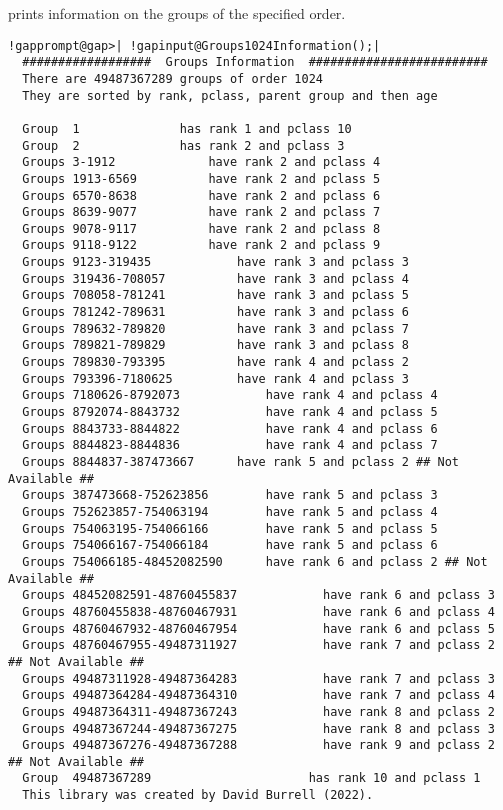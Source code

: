 \documentclass[a4paper,11pt]{report}
\begin{document}
{{{ prints information on the groups of the specified order. 
\begin{Verbatim}[commandchars=!@|,fontsize=\small,frame=single,label=Example]
  !gapprompt@gap>| !gapinput@Groups1024Information();|
  ##################  Groups Information  #########################
  There are 49487367289 groups of order 1024
  They are sorted by rank, pclass, parent group and then age
  
  Group  1				has rank 1 and pclass 10
  Group  2				has rank 2 and pclass 3
  Groups 3-1912				have rank 2 and pclass 4
  Groups 1913-6569			have rank 2 and pclass 5
  Groups 6570-8638			have rank 2 and pclass 6
  Groups 8639-9077			have rank 2 and pclass 7
  Groups 9078-9117			have rank 2 and pclass 8
  Groups 9118-9122			have rank 2 and pclass 9
  Groups 9123-319435			have rank 3 and pclass 3
  Groups 319436-708057			have rank 3 and pclass 4
  Groups 708058-781241			have rank 3 and pclass 5
  Groups 781242-789631			have rank 3 and pclass 6
  Groups 789632-789820			have rank 3 and pclass 7
  Groups 789821-789829			have rank 3 and pclass 8
  Groups 789830-793395			have rank 4 and pclass 2
  Groups 793396-7180625			have rank 4 and pclass 3
  Groups 7180626-8792073			have rank 4 and pclass 4
  Groups 8792074-8843732			have rank 4 and pclass 5
  Groups 8843733-8844822			have rank 4 and pclass 6
  Groups 8844823-8844836			have rank 4 and pclass 7
  Groups 8844837-387473667		have rank 5 and pclass 2 ## Not Available ##
  Groups 387473668-752623856		have rank 5 and pclass 3
  Groups 752623857-754063194		have rank 5 and pclass 4
  Groups 754063195-754066166		have rank 5 and pclass 5
  Groups 754066167-754066184		have rank 5 and pclass 6
  Groups 754066185-48452082590		have rank 6 and pclass 2 ## Not Available ##
  Groups 48452082591-48760455837	        have rank 6 and pclass 3
  Groups 48760455838-48760467931	        have rank 6 and pclass 4
  Groups 48760467932-48760467954	        have rank 6 and pclass 5
  Groups 48760467955-49487311927	        have rank 7 and pclass 2 ## Not Available ##
  Groups 49487311928-49487364283	        have rank 7 and pclass 3
  Groups 49487364284-49487364310	        have rank 7 and pclass 4
  Groups 49487364311-49487367243	        have rank 8 and pclass 2
  Groups 49487367244-49487367275	        have rank 8 and pclass 3
  Groups 49487367276-49487367288	        have rank 9 and pclass 2 ## Not Available ##
  Group  49487367289                      has rank 10 and pclass 1
  This library was created by David Burrell (2022).
\end{Verbatim}
 }

 }

 }
\end{document}
